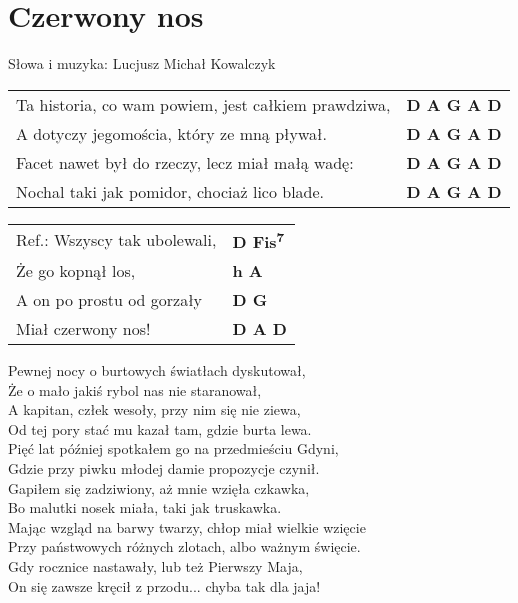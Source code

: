 \section{Czerwony nos}

Słowa i muzyka: Lucjusz Michał Kowalczyk \\

\vspace{2em}
\begin{tabular}{@{}p{9cm}@{}l@{}}
Ta historia, co wam powiem, jest całkiem prawdziwa, & \bfseries  D A G A D \\
A dotyczy jegomościa, który ze mną pływał. & \bfseries  D A G A D \\
Facet nawet był do rzeczy, lecz miał małą wadę: & \bfseries  D A G A D \\
Nochal taki jak pomidor, chociaż lico blade. & \bfseries  D A G A D \\
\end{tabular}

\vspace{1em}
\begin{tabular}{@{}p{9cm}@{}l@{}}
Ref.: Wszyscy tak ubolewali, & \bfseries  D Fis\textsuperscript{7}  \\
Że go kopnął los, & \bfseries  h A \\
A on po prostu od gorzały & \bfseries  D G \\
Miał czerwony nos! & \bfseries  D A D \\
\end{tabular}

\vspace{1em}
Pewnej nocy o burtowych światłach dyskutował, \\
Że o mało jakiś rybol nas nie staranował, \\
A kapitan, człek wesoły, przy nim się nie ziewa, \\
Od tej pory stać mu kazał tam, gdzie burta lewa. \\

Pięć lat później spotkałem go na przedmieściu Gdyni, \\
Gdzie przy piwku młodej damie propozycje czynił. \\
Gapiłem się zadziwiony, aż mnie wzięła czkawka, \\
Bo malutki nosek miała, taki jak truskawka. \\

Mając wzgląd na barwy twarzy, chłop miał wielkie wzięcie \\
Przy państwowych różnych zlotach, albo ważnym święcie. \\
Gdy rocznice nastawały, lub też Pierwszy Maja, \\
On się zawsze kręcił z przodu... chyba tak dla jaja!